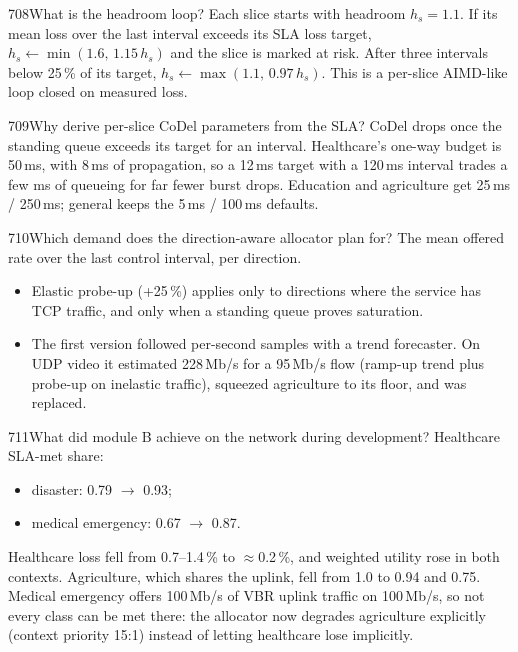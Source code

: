 \begin{qa}{708}{What is the headroom loop?}
Each slice starts with headroom $h_s=1.1$. If its mean loss over the last interval exceeds its SLA loss target,
$h_s\leftarrow\min(1.6,\,1.15\,h_s)$ and the slice is marked at risk. After three intervals below 25\,\% of its target,
$h_s\leftarrow\max(1.1,\,0.97\,h_s)$. This is a per-slice AIMD-like loop closed on measured loss.
\end{qa}

\begin{qa}{709}{Why derive per-slice CoDel parameters from the SLA?}
CoDel drops once the standing queue exceeds its target for an interval. Healthcare's one-way budget is 50\,ms, with
8\,ms of propagation, so a 12\,ms target with a 120\,ms interval trades a few ms of queueing for far fewer burst drops.
Education and agriculture get 25\,ms / 250\,ms; general keeps the 5\,ms / 100\,ms defaults.
\end{qa}

\begin{qa}{710}{Which demand does the direction-aware allocator plan for?}
The mean offered rate over the last control interval, per direction.
\begin{itemize}
\item Elastic probe-up (+25\,\%) applies only to directions where the service has TCP traffic, and only when a
standing queue proves saturation.
\item The first version followed per-second samples with a trend forecaster. On UDP video it estimated 228\,Mb/s for
a 95\,Mb/s flow (ramp-up trend plus probe-up on inelastic traffic), squeezed agriculture to its floor, and was replaced.
\end{itemize}
\end{qa}

\begin{qa}{711}{What did module B achieve on the network during development?}
Healthcare SLA-met share:
\begin{itemize}
\item disaster: 0.79 $\rightarrow$ 0.93;
\item medical emergency: 0.67 $\rightarrow$ 0.87.
\end{itemize}
Healthcare loss fell from 0.7--1.4\,\% to $\approx$0.2\,\%, and weighted utility rose in both contexts.
Agriculture, which shares the uplink, fell from 1.0 to 0.94 and 0.75. Medical emergency offers 100\,Mb/s of VBR uplink
traffic on 100\,Mb/s, so not every class can be met there: the allocator now degrades agriculture explicitly (context
priority 15:1) instead of letting healthcare lose implicitly.
\end{qa}

